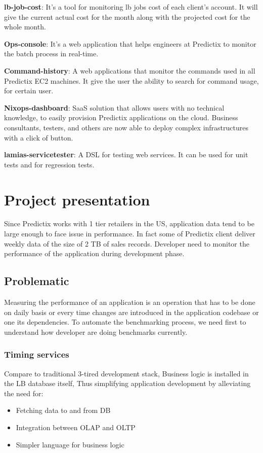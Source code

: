\textbf{lb-job-cost}: It's a tool for monitoring lb jobs cost of each client's account.
It will give the current actual cost for the month along with the projected cost
for the whole month.

\textbf{Ops-console}: It's a web application that helps engineers at Predictix to monitor
the batch process in real-time.

\textbf{Command-history}: A web applications that monitor the commands used in all
Predictix EC2 machines. It give the user the ability to search for command
usage, for certain user.

\textbf{Nixops-dashboard}:
SaaS solution that allows users with no technical knowledge, to easily provision
Predictix applications on the cloud.  Business consultants, testers, and others are
now able to deploy complex infrastructures with a click of button.

\textbf{lamias-servicetester}: A DSL for testing web services. It can be used for unit
tests and for regression tests.

\section{Project presentation}

Since Predictix works with 1 tier retailers in the US, application data tend to
be large enough to face issue in performance. In fact some of Predictix client
deliver weekly data of the size of 2 TB of sales records. 
Developer need to monitor the performance of the application during development
phase.

\subsection{Problematic}
Measuring the performance of an application is an operation that has to be done on
daily basis or every time changes are introduced in the application codebase or
one its dependencies.
To automate the benchmarking process, we need first to understand how developer
are doing benchmarks currently.

\subsubsection{Timing services}
Compare to traditional 3-tired development stack, Business logic is installed in
the LB database itself, Thus simplifying  application development by alleviating
the need for:
\begin{itemize}
\item{Fetching data to and from DB }
\item{Integration between OLAP and OLTP}
\item{Simpler language for business logic}
\end{itemize}

